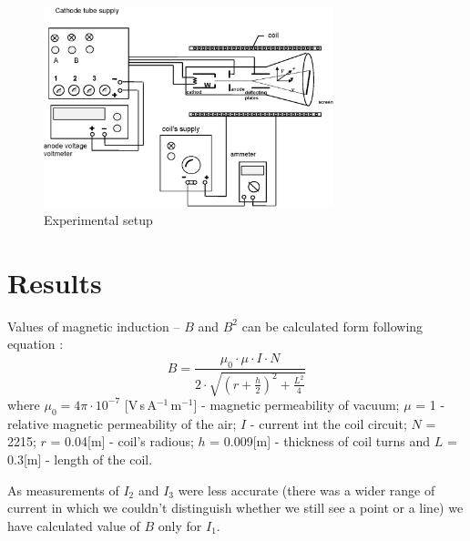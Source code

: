\documentclass[a4paper,12pt]{article}
\begin{document}
    \begin{figure}[H]
    \begin{center}
        \includegraphics[width=0.75\textwidth]{set-up}
        \caption{Experimental setup}
        \label{fig:set-up}
    \end{center}
    \end{figure}


    \section{Results}

    Values of magnetic induction -- $B$ and $B^2$ can be calculated form following equation \cite{E17}:
    \begin{equation}
        B = \frac{\mu_0 \cdot \mu \cdot I \cdot N}{2\cdot \sqrt{\left(r + \frac{h}{2} \right)^2 + \frac{L^2}{4}}}
    \end{equation}
    where $\mu_0 = 4 \pi \cdot 10 ^{-7}$ [V\,s\,A$^{-1}$\,m$^{-1}$] - magnetic permeability of vacuum; $\mu$ = 1 - relative magnetic permeability of the air; $I$ - current int the coil circuit; $N$ = 2215; $r$ = 0.04[m] - coil's radious; $h$ = 0.009[m] - thickness of coil turns and $L$ = 0.3[m] - length of the coil.
    

    As measurements of $I_2$ and  $I_3$ were less accurate (there was a wider range of current in which we couldn't distinguish whether we still see a point or a line) we have calculated value of $B$ only for $I_1$.
\end{document}
